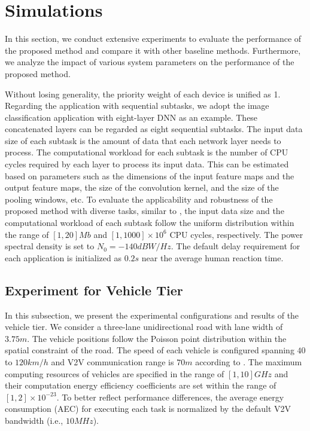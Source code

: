 \documentclass[lettersize,journal]{IEEEtran}
\begin{document}

\section{Simulations}
In this section, we conduct extensive experiments to evaluate the performance of the proposed method and compare it with other baseline methods. Furthermore, we analyze the impact of various system parameters on the performance of the proposed method.

Without losing generality, the priority weight of each device is unified as 1. Regarding the application with sequential subtasks, we adopt the image classification application\cite{ref32} with eight-layer DNN as an example. These concatenated layers can be regarded as eight sequential subtasks. The input data size of each subtask is the amount of data that each network layer needs to process. The computational workload for each subtask is the number of CPU cycles required by each layer to process its input data. This can be estimated based on parameters such as the dimensions of the input feature maps and the output feature maps, the size of the convolution kernel, and the size of the pooling windows, etc. To evaluate the applicability and robustness of the proposed method with diverse tasks, similar to \cite{ref22, ref25}, the input data size and the computational workload of each subtask follow the uniform distribution within the range of $[1, 20]Mb$ and $[1, 1000]\times10^6$ CPU cycles, respectively. The power spectral density is set to $N_0=-140dBW/Hz$. The default delay requirement for each application is initialized as $0.2s$ near the average human reaction time. 
\vspace{-0.3cm}


\subsection{Experiment for Vehicle Tier}
In this subsection, we present the experimental configurations and results of the vehicle tier. We consider a three-lane unidirectional road with lane width of $3.75 m$\cite{ref31}. The vehicle positions follow the Poisson point distribution\cite{ref15} within the spatial constraint of the road. The speed of each vehicle is configured spanning $40$ to $120 km/h$ and V2V communication range is $70 m$ according to \cite{ref31}. The maximum computing resources of vehicles are specified in the range of $[1,10] GHz$ and their computation energy efficiency coefficients are set within the range of $ [1, 2]\times 10^{-23}$\cite{ref19}. To better reflect performance differences, the average energy consumption (AEC) for executing each task is normalized by the default V2V bandwidth (i.e., $10 MHz$).
\end{document}
